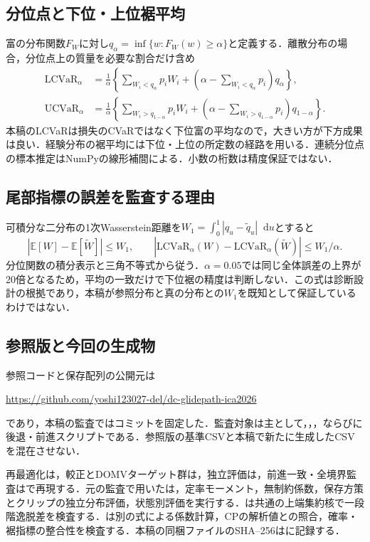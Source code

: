 \documentclass[11pt,a4paper]{article}
\numberwithin{equation}{section}
\numberwithin{table}{section}
\numberwithin{figure}{section}
\theoremstyle{plain}
\theoremstyle{definition}
\newcommand{\E}{\mathbb{E}}
\newcommand{\dd}{\mathop{}\!\mathrm{d}}
\begin{document}
\subsection{分位点と下位・上位裾平均}
富の分布関数$F_W$に対し$q_\alpha=\inf\{w:F_W(w)\geq\alpha\}$と定義する．離散分布の場合，分位点上の質量を必要な割合だけ含め
\begin{align}
\mathrm{LCVaR}_\alpha&=\frac1\alpha\left\{\sum_{W_i<q_\alpha}p_iW_i+
\left(\alpha-\sum_{W_i<q_\alpha}p_i\right)q_\alpha\right\},\\
\mathrm{UCVaR}_\alpha&=\frac1\alpha\left\{\sum_{W_i>q_{1-\alpha}}p_iW_i+
\left(\alpha-\sum_{W_i>q_{1-\alpha}}p_i\right)q_{1-\alpha}\right\}.
\end{align}
本稿のLCVaRは損失のCVaRではなく下位富の平均なので，大きい方が下方成果は良い．経験分布の裾平均には下位・上位の所定数の経路を用いる．連続分位点の標本推定はNumPyの線形補間による．小数の桁数は精度保証ではない．

\subsection{尾部指標の誤差を監査する理由}
可積分な二分布の1次Wasserstein距離を$W_1=\int_0^1|q_u-\widetilde q_u|\dd u$とすると
\begin{equation}
|\E[W]-\E[\widetilde W]|\leq W_1,\qquad
|\mathrm{LCVaR}_\alpha(W)-\mathrm{LCVaR}_\alpha(\widetilde W)|\leq W_1/\alpha.
\end{equation}
分位関数の積分表示と三角不等式から従う．$\alpha=0.05$では同じ全体誤差の上界が20倍となるため，平均の一致だけで下位裾の精度は判断しない．この式は診断設計の根拠であり，本稿が参照分布と真の分布との$W_1$を既知として保証しているわけではない．

\subsection{参照版と今回の生成物}
参照コードと保存配列の公開元は
\begin{center}\url{https://github.com/yoshi123027-del/dc-glidepath-ica2026}\end{center}
であり，本稿の監査ではコミットを固定した．監査対象は主として，，，ならびに後退・前進スクリプトである．参照版の基準CSVと本稿で新たに生成したCSVを混在させない．

再最適化は，較正とDOMVターゲット群は，独立評価は，前進一致・全境界監査はで再現する．元の監査で用いたは，定率モーメント，無制約係数，保存方策とクリップの独立分布評価，状態別評価を実行する．は共通の上端集約核で一段階逸脱差を検査する．は別の式による係数計算，CPの解析値との照合，確率・裾指標の整合性を検査する．本稿の同梱ファイルのSHA--256はに記録する．
\end{document}
